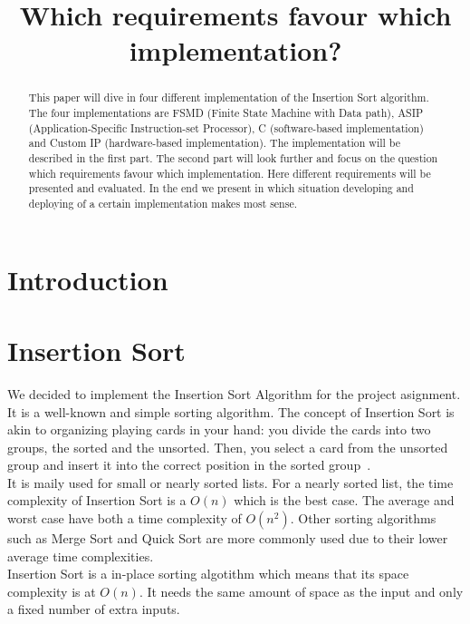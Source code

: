 \documentclass[conference]{IEEEtran}
\begin{document}
\title{Which requirements favour which implementation? \\}

\maketitle

\begin{abstract}
This paper will dive in four different implementation of the Insertion Sort algorithm. The four implementations are FSMD (Finite State Machine with Data path), ASIP (Application-Specific Instruction-set Processor), C (software-based implementation) and Custom IP (hardware-based implementation). The implementation will be described in the first part. The second part will look further and focus on the question which requirements favour which implementation. Here different requirements will be presented and evaluated. In the end we present in which situation developing and deploying of a certain implementation makes most sense. 
\end{abstract}

\section{Introduction}

\section{Insertion Sort}
We decided to implement the Insertion Sort Algorithm for the project asignment. It is a well-known and simple sorting algorithm. The concept of Insertion Sort is akin to organizing playing cards in your hand: you divide the cards into two groups, the sorted and the unsorted. Then, you select a card from the unsorted group and insert it into the correct position in the sorted group~\cite{g4g}.\\
It is maily used for small or nearly sorted lists. For a nearly sorted list, the time complexity of Insertion Sort is a $O(n)$ which is the best case. The average and worst case have both a time complexity of $O(n^2)$. Other sorting algorithms such as Merge Sort and Quick Sort are more commonly used due to their lower average time complexities.\\
Insertion Sort is a in-place sorting algotithm which means that its space complexity is at $O(n)$. It needs the same amount of space as the input and only a fixed number of extra inputs.
\end{document}
